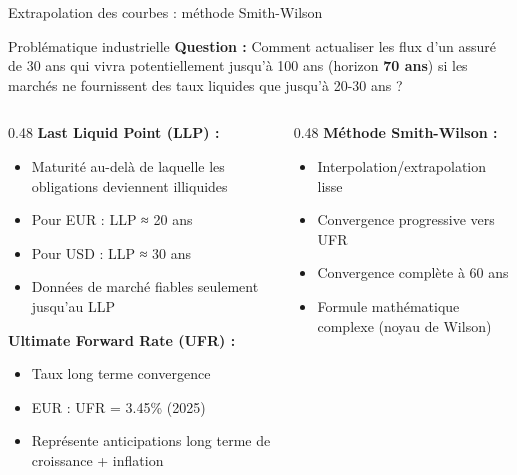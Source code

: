 \documentclass[10pt,aspectratio=169]{beamer}
\newcommand{\highlight}[1]{\textbf{\color{rougeactu}#1}}
\begin{document}
\begin{frame}{Extrapolation des courbes : méthode Smith-Wilson}
\begin{block}{Problématique industrielle}
\textbf{Question :} Comment actualiser les flux d'un assuré de 30 ans qui vivra potentiellement jusqu'à 100 ans (horizon \highlight{70 ans}) si les marchés ne fournissent des taux liquides que jusqu'à 20-30 ans ?
\end{block}

\begin{columns}[T]
\begin{column}{0.48\textwidth}
\textbf{Last Liquid Point (LLP) :}
\begin{itemize}
    \item Maturité au-delà de laquelle les obligations deviennent illiquides
    \item Pour EUR : LLP ≈ 20 ans
    \item Pour USD : LLP ≈ 30 ans
    \item Données de marché fiables seulement jusqu'au LLP
\end{itemize}

\vspace{0.3cm}
\textbf{Ultimate Forward Rate (UFR) :}
\begin{itemize}
    \item Taux long terme convergence
    \item EUR : UFR = 3.45\% (2025)
    \item Représente anticipations long terme de croissance + inflation
\end{itemize}
\end{column}
\begin{column}{0.48\textwidth}
\textbf{Méthode Smith-Wilson :}
\begin{itemize}
    \item Interpolation/extrapolation lisse
    \item Convergence progressive vers UFR
    \item Convergence complète à 60 ans
    \item Formule mathématique complexe (noyau de Wilson)
\end{itemize}

\vspace{0.3cm}
\begin{center}
\end{center}
\end{column}
\end{columns}


\end{frame}
\end{document}
